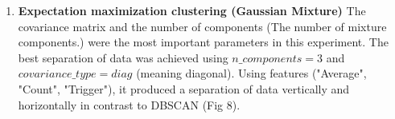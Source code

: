 \documentclass[11pt, fullpage,letterpaper]{article}
\begin{document}
\begin{flushleft}
\begin{enumerate}
\begin{figure}
\begin{minipage}{0.5\textwidth}
            \end{minipage}
        \end{figure}
        \break
        \item \textbf{Expectation maximization clustering (Gaussian Mixture)} The covariance matrix
        and the number of components (The number of mixture components.) were the most important
        parameters in this experiment. The best separation of data was achieved using $n\_components=3$
        and $covariance\_type=diag$ (meaning diagonal).
        Using features ("Average", "Count", "Trigger"), it produced a separation of data
        vertically and horizontally in contrast to DBSCAN (Fig 8).
    \end{enumerate}
\end{flushleft}
\end{document}
